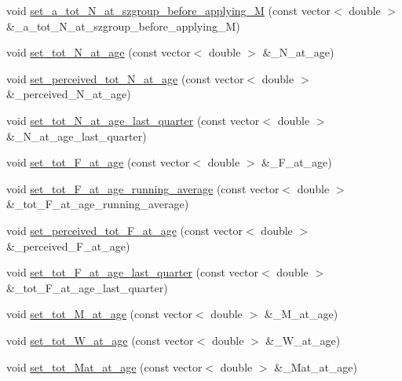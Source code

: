 \begin{DoxyCompactItemize}
\item 
void \mbox{\hyperlink{class_population_add02af66e78668224dfbacc8a4ddf704}{set\+\_\+a\+\_\+tot\+\_\+\+N\+\_\+at\+\_\+szgroup\+\_\+before\+\_\+applying\+\_\+M}} (const vector$<$ double $>$ \&\+\_\+a\+\_\+tot\+\_\+\+N\+\_\+at\+\_\+szgroup\+\_\+before\+\_\+applying\+\_\+M)
\item 
void \mbox{\hyperlink{class_population_a3444d96e560758bf888e3f571d5e22a2}{set\+\_\+tot\+\_\+\+N\+\_\+at\+\_\+age}} (const vector$<$ double $>$ \&\+\_\+\+N\+\_\+at\+\_\+age)
\item 
void \mbox{\hyperlink{class_population_a0b0d9da60bfdf7f5130bfccaacb5a701}{set\+\_\+perceived\+\_\+tot\+\_\+\+N\+\_\+at\+\_\+age}} (const vector$<$ double $>$ \&\+\_\+perceived\+\_\+\+N\+\_\+at\+\_\+age)
\item 
void \mbox{\hyperlink{class_population_aff05fe4dc6b58ef517e5515a91cb369d}{set\+\_\+tot\+\_\+\+N\+\_\+at\+\_\+age\+\_\+last\+\_\+quarter}} (const vector$<$ double $>$ \&\+\_\+\+N\+\_\+at\+\_\+age\+\_\+last\+\_\+quarter)
\item 
void \mbox{\hyperlink{class_population_aa909babf9ec946ecd7c3cdd7ba3f682b}{set\+\_\+tot\+\_\+\+F\+\_\+at\+\_\+age}} (const vector$<$ double $>$ \&\+\_\+\+F\+\_\+at\+\_\+age)
\item 
void \mbox{\hyperlink{class_population_a55a897b6756a38aa2f8ec28a308653f4}{set\+\_\+tot\+\_\+\+F\+\_\+at\+\_\+age\+\_\+running\+\_\+average}} (const vector$<$ double $>$ \&\+\_\+tot\+\_\+\+F\+\_\+at\+\_\+age\+\_\+running\+\_\+average)
\item 
void \mbox{\hyperlink{class_population_a406395c451553a74cb8057b522b92dba}{set\+\_\+perceived\+\_\+tot\+\_\+\+F\+\_\+at\+\_\+age}} (const vector$<$ double $>$ \&\+\_\+perceived\+\_\+\+F\+\_\+at\+\_\+age)
\item 
void \mbox{\hyperlink{class_population_abeba579dcfb507b851e9289162aa66ac}{set\+\_\+tot\+\_\+\+F\+\_\+at\+\_\+age\+\_\+last\+\_\+quarter}} (const vector$<$ double $>$ \&\+\_\+tot\+\_\+\+F\+\_\+at\+\_\+age\+\_\+last\+\_\+quarter)
\item 
void \mbox{\hyperlink{class_population_af83edcec617cc363dad6ff33cafda0e6}{set\+\_\+tot\+\_\+\+M\+\_\+at\+\_\+age}} (const vector$<$ double $>$ \&\+\_\+\+M\+\_\+at\+\_\+age)
\item 
void \mbox{\hyperlink{class_population_a2db609afbba5d88acb379b2c15e76ff6}{set\+\_\+tot\+\_\+\+W\+\_\+at\+\_\+age}} (const vector$<$ double $>$ \&\+\_\+\+W\+\_\+at\+\_\+age)
\item 
void \mbox{\hyperlink{class_population_a41c03a9d39741527eb2cf6bfd6d96b99}{set\+\_\+tot\+\_\+\+Mat\+\_\+at\+\_\+age}} (const vector$<$ double $>$ \&\+\_\+\+Mat\+\_\+at\+\_\+age)

\end{DoxyCompactItemize}
